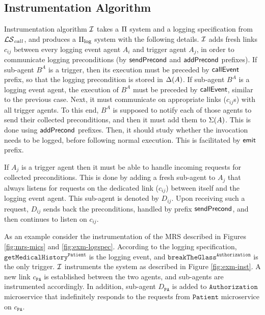 \subsection{Instrumentation Algorithm} \label{sec:inst-alg}
Instrumentation algorithm $\mathcal{I}$ takes a $\Pi$ system and a logging specification from ${\mathcal{LS}_{\mathit{call}}}$, and produces a $\Pi_{\mathrm{log}}$ system with the following details. $\mathcal{I}$ adds fresh links $c_{ij}$ between every logging event agent $A_i$ and trigger agent $A_j$, in order to communicate logging preconditions (by $\mathsf{sendPrecond}$ and $\mathsf{addPrecond}$ prefixes). If sub-agent $B^A$ is a trigger, then its execution must be preceded by $\mathsf{callEvent}$ prefix, so that the logging precondition is stored in $\Delta(A)$. If sub-agent $B^A$ is a logging event agent, the execution of $B^A$ must be preceded by $\mathsf{callEvent}$, similar to the previous case. Next, it must communicate on appropriate links ($c_{ij}$s) with all trigger agents. To this end, $B^A$ is supposed to notify each of those agents to send their collected preconditions, and then it must add them to $\Sigma(A)$. This is done using $\mathsf{addPrecond}$ prefixes. Then, it should study whether the invocation needs to be logged, before following normal execution. This is facilitated by $\mathsf{emit}$ prefix. 

If $A_j$ is a trigger agent then it must be able to handle incoming requests for collected preconditions. This is done by adding a fresh sub-agent to $A_j$ that always listens for requests on the dedicated link ($c_{ij}$) between itself and the logging event agent. This sub-agent is denoted by $D_{ij}$. Upon receiving such a request, $D_{ij}$ sends back the preconditions, handled by prefix $\mathsf{sendPrecond}$, and then continues to listen on $c_{ij}$.

As an example consider the instrumentation of the MRS described in Figures \ref{fig:mrs-mics} and \ref{fig:exm-logspec}. According to the logging specification, $\mathtt{getMedicalHistory}^{\mathtt{Patient}}$ is the logging event, and $\mathtt{breakTheGlass}^{\mathtt{Authorization}}$ is the only trigger. $\mathcal{I}$ instruments the system as described in Figure \ref{fig:exm-inst}.  A new link $c_{\mathtt{PA}}$ is established between the two agents, and sub-agents are instrumented accordingly. In addition, sub-agent $D_{\mathtt{PA}}$ is added to $\mathtt{Authorization}$ microservice that indefinitely responds to the requests from $\mathtt{Patient}$ microservice on $c_{\mathtt{PA}}$.

